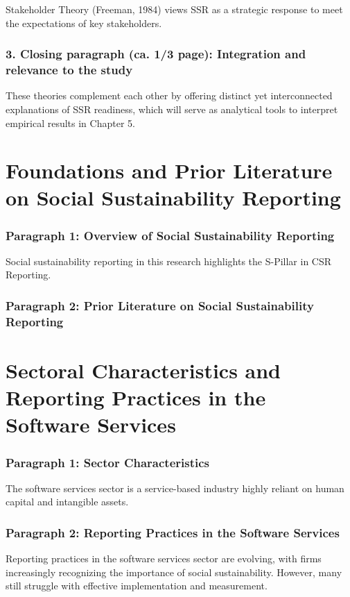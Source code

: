 Stakeholder Theory (Freeman, 1984) views SSR as a strategic response to meet the expectations of key stakeholders.

\subsubsection{3. Closing paragraph (ca. 1/3 page): Integration and relevance to the study}

These theories complement each other by offering distinct yet interconnected explanations of SSR readiness, 
which will serve as analytical tools to interpret empirical results in Chapter 5.

\section{Foundations and Prior Literature on Social Sustainability Reporting}
\subsubsection{Paragraph 1: Overview of Social Sustainability Reporting}
Social sustainability reporting in this research highlights the S-Pillar in CSR Reporting.

\subsubsection{Paragraph 2: Prior Literature on Social Sustainability Reporting}



\section{Sectoral Characteristics and Reporting Practices in the Software Services}
\subsubsection{Paragraph 1: Sector Characteristics}
The software services sector is a service-based industry highly reliant on human capital and intangible assets.

\subsubsection{Paragraph 2: Reporting Practices in the Software Services}
Reporting practices in the software services sector are evolving, with firms increasingly recognizing 
the importance of social sustainability. However, many still struggle with effective implementation and measurement.

